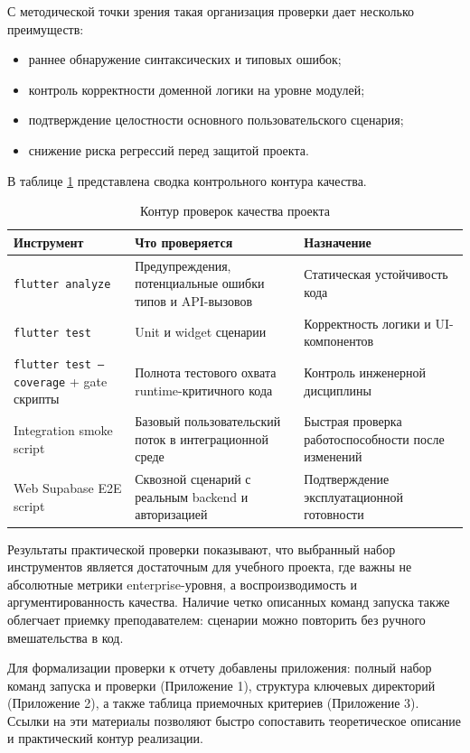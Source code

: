 С методической точки зрения такая организация проверки дает несколько преимуществ:
\begin{itemize}
  \item раннее обнаружение синтаксических и типовых ошибок;
  \item контроль корректности доменной логики на уровне модулей;
  \item подтверждение целостности основного пользовательского сценария;
  \item снижение риска регрессий перед защитой проекта.
\end{itemize}

В таблице \ref{tab:quality-checks} представлена сводка контрольного контура качества.

\begin{table}[h!]
\caption{Контур проверок качества проекта}
\centering
\begin{tabular}{|p{4.2cm}|p{5.5cm}|p{4.5cm}|}
\hline
\textbf{Инструмент} & \textbf{Что проверяется} & \textbf{Назначение} \\
\hline
\texttt{flutter analyze} & Предупреждения, потенциальные ошибки типов и API-вызовов & Статическая устойчивость кода \\
\hline
\texttt{flutter test} & Unit и widget сценарии & Корректность логики и UI-компонентов \\
\hline
\texttt{flutter test --coverage} + gate скрипты & Полнота тестового охвата runtime-критичного кода & Контроль инженерной дисциплины \\
\hline
Integration smoke script & Базовый пользовательский поток в интеграционной среде & Быстрая проверка работоспособности после изменений \\
\hline
Web Supabase E2E script & Сквозной сценарий с реальным backend и авторизацией & Подтверждение эксплуатационной готовности \\
\hline
\end{tabular}
\label{tab:quality-checks}
\end{table}

Результаты практической проверки показывают, что выбранный набор инструментов является достаточным для учебного проекта, где важны не абсолютные метрики enterprise-уровня, а воспроизводимость и аргументированность качества. Наличие четко описанных команд запуска также облегчает приемку преподавателем: сценарии можно повторить без ручного вмешательства в код.

Для формализации проверки к отчету добавлены приложения: полный набор команд запуска и проверки (Приложение 1), структура ключевых директорий (Приложение 2), а также таблица приемочных критериев (Приложение 3). Ссылки на эти материалы позволяют быстро сопоставить теоретическое описание и практический контур реализации.

